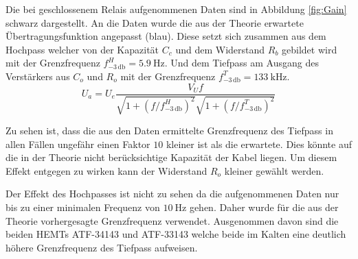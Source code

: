 \begin{minipage}[!c]{\textwidth}
\begin{minipage}[c]{\textwidth}
\begin{minipage}[c]{0.5\textwidth}
\end{minipage}
\vspace{-0.45cm}
\vspace{-0.4cm}
\label{fig:Gain}
\end{minipage}
\end{minipage}

Die bei geschlossenem Relais aufgenommenen Daten sind in Abbildung \ref{fig:Gain} schwarz dargestellt.
An die Daten wurde die aus der Theorie erwartete Übertragungsfunktion angepasst (blau).
Diese setzt sich zusammen aus dem Hochpass welcher von der Kapazität $C_c$ und dem Widerstand $R_b$ gebildet wird mit der Grenzfrequenz $f^H_{-3\,\mathrm{db}} = \SI{5.9}{\hertz}$.
Und dem Tiefpass am Ausgang des Verstärkers aus $C_o$ und $R_o$ mit der Grenzfrequenz $f^T_{-3\,\mathrm{db}} = \SI{133}{\kilo\hertz}$.
\begin{equation}
U_a = U_e \frac{V_Uf}{\sqrt{1+(f/f^H_{-3\,\mathrm{db}})^2}\sqrt{1+(f/f^T_{-3\,\mathrm{db}})^2}}
\end{equation}

Zu sehen ist, dass die aus den Daten ermittelte Grenzfrequenz des Tiefpass in allen Fällen ungefähr einen Faktor $10$ kleiner ist als die erwartete.
Dies könnte auf die in der Theorie nicht berücksichtige Kapazität der Kabel liegen.
Um diesem Effekt entgegen zu wirken kann der Widerstand $R_o$ kleiner gewählt werden.

Der Effekt des Hochpasses ist nicht zu sehen da die aufgenommenen Daten nur bis zu einer minimalen Frequenz von $\SI{10}{\hertz}$ gehen.
Daher wurde für die aus der Theorie vorhergesagte Grenzfrequenz verwendet.
Ausgenommen davon sind die beiden HEMTs ATF-34143 und ATF-33143 welche beide im Kalten eine deutlich höhere Grenzfrequenz des Tiefpass aufweisen.

